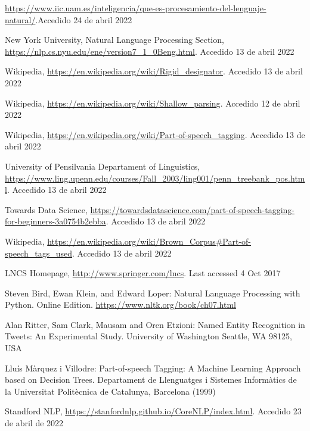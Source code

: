 \documentclass[runningheads]{llncs}
\begin{document}
\begin{thebibliography}{8}


\url{https://www.iic.uam.es/inteligencia/que-es-procesamiento-del-lenguaje-natural/}.Accedido 24 de abril 2022

New York University, Natural Language Processing Section, \url{https://nlp.cs.nyu.edu/ene/version7\_1\_0Beng.html}. Accedido 13 de abril 2022

Wikipedia, \url{https://en.wikipedia.org/wiki/Rigid\_designator}. Accedido 13 de abril 2022

Wikipedia, \url{https://en.wikipedia.org/wiki/Shallow\_parsing}. Accedido 12 de abril 2022

Wikipedia, \url{https://en.wikipedia.org/wiki/Part-of-speech\_tagging}. Accedido 13 de abril 2022

University of Pensilvania Departament of Linguistics, \url{https://www.ling.upenn.edu/courses/Fall\_2003/ling001/penn\_treebank\_pos.html}. Accedido 13 de abril 2022

Towards Data Science, \url{https://towardsdatascience.com/part-of-speech-tagging-for-beginners-3a0754b2ebba}. Accedido 13 de abril 2022

Wikipedia, \url{https://en.wikipedia.org/wiki/Brown\_Corpus\#Part-of-speech\_tags\_used}. Accedido 13 de abril 2022

LNCS Homepage, \url{http://www.springer.com/lncs}. Last accessed 4 Oct 2017

Steven Bird, Ewan Klein, and Edward Loper: Natural Language Processing with Python. Online Edition. \url{https://www.nltk.org/book/ch07.html}

Alan Ritter, Sam Clark, Mausam and Oren Etzioni: Named Entity Recognition in Tweets:
An Experimental Study. University of Washington Seattle, WA 98125, USA

Lluís Màrquez i Villodre: Part-of-speech Tagging: A Machine Learning Approach based on Decision Trees. Departament de Llenguatges i Sistemes Informàtics de la Universitat Politècnica de Catalunya, Barcelona (1999)

Standford NLP, \url{https://stanfordnlp.github.io/CoreNLP/index.html}. Accedido 23 de abril de 2022


\end{thebibliography}
\end{document}
